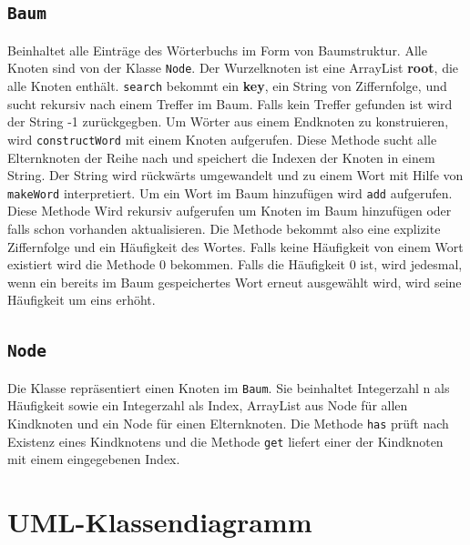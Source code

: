 \subsection{\texttt{Baum}}
    
    Beinhaltet alle Einträge des Wörterbuchs im Form von Baumstruktur. Alle Knoten sind von der Klasse \texttt{Node}.
    Der Wurzelknoten ist eine ArrayList \textbf{root}, die alle Knoten enthält. \texttt{search} bekommt ein \textbf{key}, ein String von Ziffernfolge, und sucht rekursiv nach einem Treffer im Baum. Falls kein Treffer gefunden ist wird der String -1 zurückgegben. Um Wörter aus einem Endknoten zu konstruieren, wird \texttt{constructWord} mit einem Knoten aufgerufen. Diese Methode sucht alle Elternknoten der Reihe nach und speichert die Indexen der Knoten in einem String. Der String wird rückwärts umgewandelt und zu einem Wort mit Hilfe von \texttt{makeWord} interpretiert. Um ein Wort im Baum hinzufügen wird \texttt{add} aufgerufen. Diese Methode Wird rekursiv aufgerufen um Knoten im Baum hinzufügen oder falls schon vorhanden aktualisieren. Die Methode bekommt also eine explizite Ziffernfolge und ein Häufigkeit des Wortes. Falls keine Häufigkeit von einem Wort existiert wird die Methode 0 bekommen. Falls die Häufigkeit 0 ist, wird jedesmal, wenn ein bereits im Baum gespeichertes Wort erneut ausgewählt wird, wird seine Häufigkeit um eins erhöht.
    
\subsection{\texttt{Node}}
    
    Die Klasse repräsentiert einen Knoten im \texttt{Baum}. Sie beinhaltet Integerzahl n als Häufigkeit sowie ein Integerzahl als Index, ArrayList aus Node für allen Kindknoten und ein Node für einen Elternknoten.
    Die Methode \texttt{has} prüft nach Existenz eines Kindknotens und die Methode \texttt{get} liefert einer der Kindknoten mit einem eingegebenen Index.


\clearpage

\section{UML-Klassendiagramm}
%

